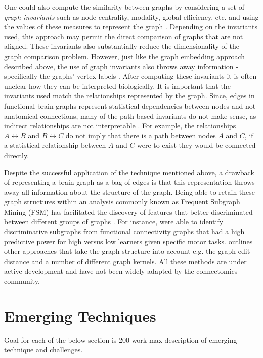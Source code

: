 One could also compute the similarity between graphs by considering a set of \emph{graph-invariants} such as node centrality, modality, global efficiency, etc. and using the values of these measures to represent the graph \cite{rubinov,bullmoreReview}. Depending on the invariants used, this approach may permit the direct comparison of graphs that are not aligned. These invariants also substantially reduce the dimensionality of the graph comparison problem. However, just like the graph embedding approach described above, the use of graph invariants also throws away information - specifically the graphs' vertex labels \cite{Vogelstein2012}. After computing these invariants it is often unclear how they can be interpreted biologically. It is important that the invariants used match the relationships represented by the graph. Since, edges in functional brain graphs represent statistical dependencies between nodes and not anatomical connections, many of the path based invariants do not make sense, as indirect relationships are not interpretable \cite{}. For example, the relationships $A \leftrightarrow B$ and $B \leftrightarrow C$ do not imply that there is a path between nodes $A$ and $C$, if a statistical relationship between $A$ and $C$ were to exist they would be connected directly.

Despite the successful application of the technique mentioned above, a drawback of representing a brain graph as a bag of edges is that this representation throws away all information about the structure of the graph. Being able to retain these graph structures within an analysis commonly known as Frequent Subgraph Mining (FSM) has facilitated the discovery of features that better discriminated between different groups of graphs \cite{Harrison2013}. For instance, \cite{Bogdanov2014} were able to identify discriminative subgraphs from functional connectivity graphs that had a high predictive power for high versus low learners given specific motor tasks. \cite{Richiardi2013} outlines other approaches that take the graph structure into account e.g. the graph edit distance and a number of different graph kernels. All these methods are under active development and have not been widely adapted by the connectomics community.

   

\section{Emerging Techniques}

Goal for each of the below section is 200 work max description of emerging technique and challenges.

